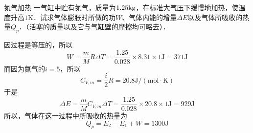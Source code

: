 \begin{example}{氮气加热}
一气缸中贮有氮气，质量为$1.25\rm kg$，在标准大气压下缓慢地加热，使温度升高$1\mathrm K$．试求气体膨胀时所做的功$W$、气体内能的增量$\Delta E$以及气体所吸收的热量$Q_p$．（活塞的质量以及它与气缸壁的摩擦均可略去）．

因过程是等压的，所以
\begin{equation}
W=\frac{m}{M} R \Delta T=\frac{1.25}{0.028} \times 8.31 \times 1 \mathrm{J}=371 \mathrm{J}
\end{equation}
而因为氮气的$i=5$，所以
\begin{equation}
C_{V, {m}}=\frac{i}{2} R=20.8 \mathrm{J} /(\mathrm{mol} \cdot \mathrm{K})
\end{equation}
于是
\begin{equation}
\Delta E=\frac{m}{M} C_{V, {m}} \Delta T=\frac{1.25}{0.028} \times 20.8 \times 1 \mathrm{J}=929 \mathrm{J}
\end{equation}
所以，气体在这一过程中所吸收的热量为
\begin{equation}
Q_{p}=E_{2}-E_{1}+W=1300 \mathrm{J}
\end{equation}
\end{example}   